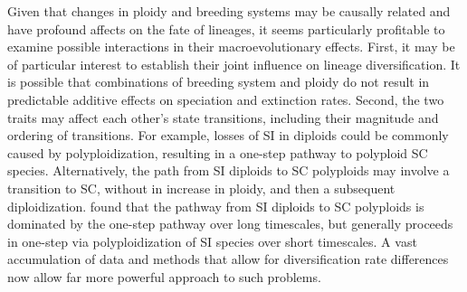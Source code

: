 Given that changes in ploidy and breeding systems may be causally related and have profound affects on the fate of lineages, it seems particularly profitable to examine possible interactions in their macroevolutionary effects.
First, it may be of particular interest to establish their joint influence on lineage diversification.
It is possible that combinations of breeding system and ploidy do not result in predictable additive effects on speciation and extinction rates.
Second, the two traits may affect each other's state transitions, including their magnitude and ordering of transitions.
For example, losses of SI in diploids could be commonly caused by polyploidization, resulting in a one-step pathway to polyploid SC species. 
Alternatively, the path from SI diploids to SC polyploids may involve a transition to SC, without in increase in ploidy, and then a subsequent diploidization. 
\citet{robertson_2011} found that the pathway from SI diploids to SC polyploids is dominated by the one-step pathway over long timescales, but generally proceeds in one-step via polyploidization of SI species over short timescales.
A vast accumulation of data and methods that allow for diversification rate differences now allow far more powerful approach to such problems. %

